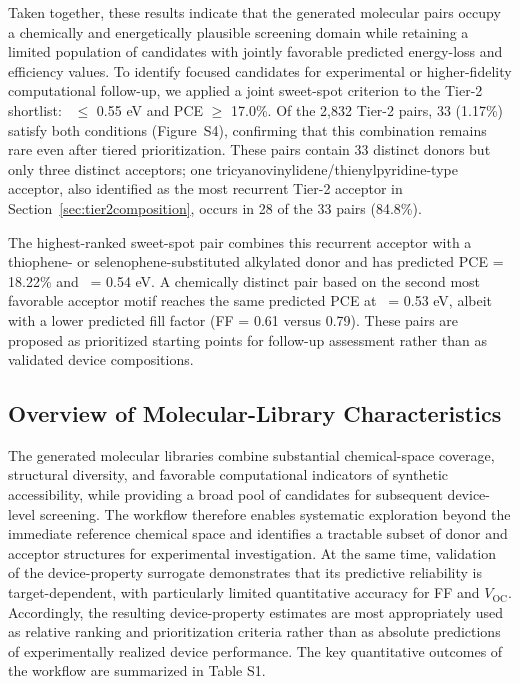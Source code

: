 \documentclass[12pt]{article}
\newcommand{\com}{\color{magenta}}
\newcommand{\voc}{$V_\mathrm{OC}$}
\begin{document}
Taken together, these results indicate that the generated molecular pairs occupy a chemically and energetically plausible screening domain while retaining a limited population of candidates with jointly favorable predicted energy-loss and efficiency values. To identify focused candidates for experimental or higher-fidelity computational follow-up, we applied a joint sweet-spot criterion to the Tier-2 shortlist: \Eloss\ $\leq$ 0.55 eV and PCE $\geq$ 17.0\%. Of the 2{,}832 Tier-2 pairs, 33 (1.17\%) satisfy both conditions (Figure~S4), confirming that this combination remains rare even after tiered prioritization. {\com These pairs contain 33 distinct donors but only three distinct acceptors; one tricyanovinylidene/thienylpyridine-type acceptor, also identified as the most recurrent Tier-2 acceptor in Section~\ref{sec:tier2composition}, occurs in 28 of the 33 pairs (84.8\%).}

The highest-ranked sweet-spot pair combines this recurrent acceptor with a thiophene- or selenophene-substituted alkylated donor and has predicted PCE = 18.22\% and \Eloss\ = 0.54 eV. A chemically distinct pair based on the second most favorable acceptor motif reaches the same predicted PCE at \Eloss\ = 0.53 eV, albeit with a lower predicted fill factor (FF = 0.61 versus 0.79). These pairs are proposed as prioritized starting points for follow-up assessment rather than as validated device compositions.

\subsection{Overview of Molecular-Library Characteristics}
The generated molecular libraries combine substantial chemical-space coverage, structural diversity, and favorable computational indicators of synthetic accessibility, while providing a broad pool of candidates for subsequent device-level screening. The workflow therefore enables systematic exploration beyond the immediate reference chemical space and identifies a tractable subset of donor and acceptor structures for experimental investigation. At the same time, validation of the device-property surrogate demonstrates that its predictive reliability is target-dependent, with particularly limited quantitative accuracy for FF and \voc. Accordingly, the resulting device-property estimates are most appropriately used as relative ranking and prioritization criteria rather than as absolute predictions of experimentally realized device performance. The key quantitative outcomes of the workflow are summarized in Table S1.
\end{document}
